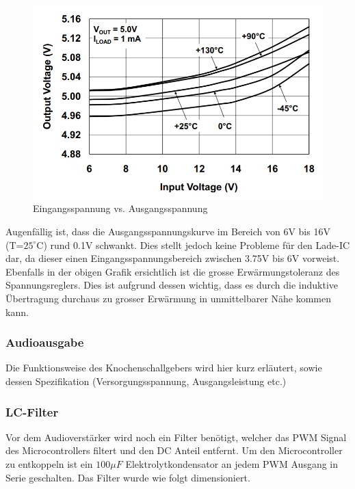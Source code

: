 \begin{figure}[H]
	\begin{center}
		\includegraphics[width=120mm]{data/Linearregler_5V.png}
		\caption[MCP1703A Linearregler Spannungsverhalten]{Eingangsspannung vs. Ausgangsspannung \cite{MCP1703LinearRegulator}} %
		\label{fig:Linearregler 5V}
	\end{center}
\end{figure} 

Augenfällig ist, dass die Ausgangsspannungskurve im Bereich von 6V bis 16V (T=$25^\circ\text{C}$) rund 0.1V schwankt. Dies stellt jedoch keine Probleme für den Lade-IC dar, da dieser einen Eingangsspannungsbereich zwischen 3.75V bis 6V vorweist. Ebenfalls in der obigen Grafik ersichtlich ist die grosse Erwärmungstoleranz des Spannungsreglers. Dies ist aufgrund dessen wichtig, dass es durch die induktive Übertragung durchaus zu grosser Erwärmung in unmittelbarer Nähe kommen kann.

\subsubsection{Audioausgabe}
Die Funktionsweise des Knochenschallgebers wird hier kurz erläutert, sowie dessen Spezifikation (Versorgungsspannung, Ausgangsleistung etc.)

\subsubsection{LC-Filter}
Vor dem Audioverstärker wird noch ein Filter benötigt, welcher das PWM Signal des Microcontrollers filtert und den DC Anteil entfernt. Um den Microcontroller zu entkoppeln ist ein $100\mu F$ Elektrolytkondensator an jedem PWM Ausgang in Serie geschalten. Das Filter wurde wie folgt dimensioniert. 

